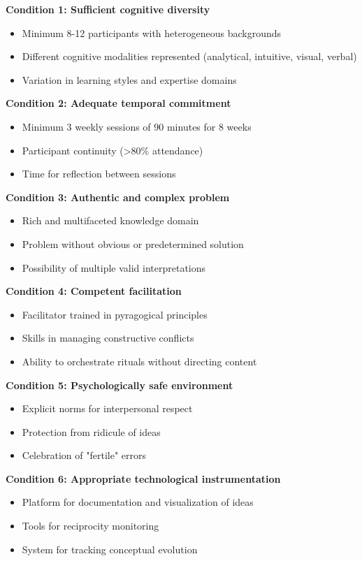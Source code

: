 \textbf{Condition 1: Sufficient cognitive diversity}
\begin{itemize}
	\item Minimum 8-12 participants with heterogeneous backgrounds
	\item Different cognitive modalities represented (analytical, intuitive, visual, verbal)
	\item Variation in learning styles and expertise domains
\end{itemize}

\textbf{Condition 2: Adequate temporal commitment}
\begin{itemize}
	\item Minimum 3 weekly sessions of 90 minutes for 8 weeks
	\item Participant continuity (>80\% attendance)
	\item Time for reflection between sessions
\end{itemize}

\textbf{Condition 3: Authentic and complex problem}
\begin{itemize}
	\item Rich and multifaceted knowledge domain
	\item Problem without obvious or predetermined solution
	\item Possibility of multiple valid interpretations
\end{itemize}

\textbf{Condition 4: Competent facilitation}
\begin{itemize}
	\item Facilitator trained in pyragogical principles
	\item Skills in managing constructive conflicts
	\item Ability to orchestrate rituals without directing content
\end{itemize}

\textbf{Condition 5: Psychologically safe environment}
\begin{itemize}
	\item Explicit norms for interpersonal respect
	\item Protection from ridicule of ideas
	\item Celebration of "fertile" errors
\end{itemize}

\textbf{Condition 6: Appropriate technological instrumentation}
\begin{itemize}
	\item Platform for documentation and visualization of ideas
	\item Tools for reciprocity monitoring
	\item System for tracking conceptual evolution
\end{itemize}

